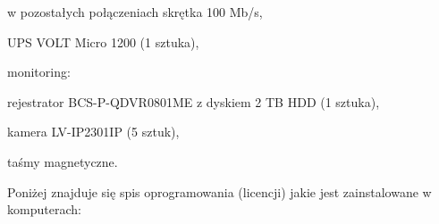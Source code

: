 \begin{minipage}[\right]{15cm}
\begin{itemize*}
\begin{itemize*}
		\item w pozostałych połączeniach skrętka 100 Mb/s,
	\end{itemize*}
	\item UPS VOLT Micro 1200 (1 sztuka),
	\item monitoring:
	\begin{itemize*}
		\item rejestrator BCS-P-QDVR0801ME z dyskiem 2 TB HDD (1 sztuka),
		\item kamera LV-IP2301IP (5 sztuk),
	\end{itemize*}
	\item taśmy magnetyczne.
\end{itemize*}
\end{minipage}

\newpage
Poniżej znajduje się spis oprogramowania (licencji) jakie jest \linebreak zainstalowane w komputerach:

